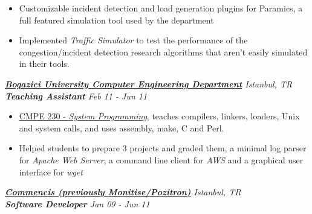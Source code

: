 \documentclass[line, margin]{res}
\begin{document}
\begin{resume}
\vspace{-0.3cm}
\begin{itemize} \itemsep -3pt
	\vspace{-.2cm}
	\item Customizable incident detection and load generation plugins for Paramics, a full featured simulation tool used by the department
	\item Implemented \textit{Traffic Simulator} to test the performance of the congestion/incident detection research algorithms that aren't easily simulated in their tools.
\end{itemize}

{\sl \textbf{\href{http://www.cmpe.boun.edu.tr/}{Bogazici University Computer Engineering Department}} \hfill Istanbul, TR} \\
{\sl \textbf{Teaching Assistant} \hfill Feb 11 - Jun 11} \\

\vspace{-.3cm}
\begin{itemize} \itemsep -3pt
	\vspace{-.2cm}
	\item \href{http://www.cmpe.boun.edu.tr/courses/?cmpe=230}{CMPE 230 - \textit{System Programming}}, teaches compilers, linkers, loaders, Unix and system calls, and uses assembly, make, C and Perl.
	\item Helped students to prepare 3 projects and graded them, a minimal log parser for \textit{Apache Web Server}, a command line client for \textit{AWS} and a graphical user interface for \textit{wget}
\end{itemize}

{\sl \textbf{\href{https://www.commencis.com/}{Commencis (previously Monitise/Pozitron)}} \hfill Istanbul, TR} \\
{\sl \textbf{Software Developer} \hfill Jan 09 - Jun 11} \\


\end{resume}
\end{document}
